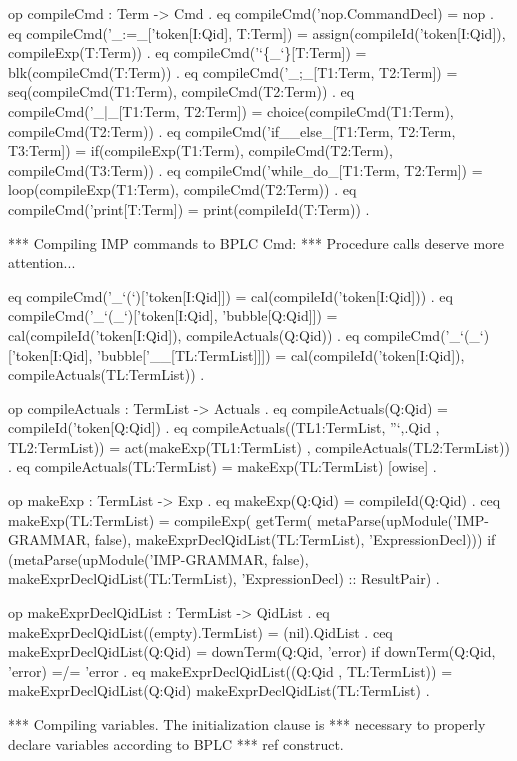 \documentclass[a4paper,openany]{book}
\begin{document}
\nwenddocs{}\endmoddef\nwstartdeflinemarkup\nwenddeflinemarkup
 op compileCmd : Term -> Cmd .
 eq compileCmd('nop.CommandDecl) = nop .
 eq compileCmd('_:=_['token[I:Qid], T:Term]) =
    assign(compileId('token[I:Qid]), compileExp(T:Term)) .
 eq compileCmd('`\{_`\}[T:Term]) = blk(compileCmd(T:Term)) .
 eq compileCmd('_;_[T1:Term, T2:Term]) =
    seq(compileCmd(T1:Term), compileCmd(T2:Term)) .
 eq compileCmd('_|_[T1:Term, T2:Term]) =
    choice(compileCmd(T1:Term), compileCmd(T2:Term)) .
 eq compileCmd('if__else_[T1:Term, T2:Term, T3:Term]) =
    if(compileExp(T1:Term), compileCmd(T2:Term), 
       compileCmd(T3:Term)) .
 eq compileCmd('while_do_[T1:Term, T2:Term]) =
    loop(compileExp(T1:Term), compileCmd(T2:Term)) .
 eq compileCmd('print[T:Term]) = print(compileId(T:Term)) .

 *** Compiling IMP commands to BPLC Cmd:
 *** Procedure calls deserve more attention...

 eq compileCmd('_`(`)['token[I:Qid]]) =
    cal(compileId('token[I:Qid])) .
 eq compileCmd('_`(_`)['token[I:Qid], 'bubble[Q:Qid]]) =
    cal(compileId('token[I:Qid]), compileActuals(Q:Qid)) .
 eq compileCmd('_`(_`)['token[I:Qid], 
               'bubble['__[TL:TermList]]]) =
    cal(compileId('token[I:Qid]), compileActuals(TL:TermList)) .

 op compileActuals : TermList -> Actuals .
 eq compileActuals(Q:Qid) = compileId('token[Q:Qid]) .
 eq compileActuals((TL1:TermList, ''`,.Qid , TL2:TermList)) =
    act(makeExp(TL1:TermList) , compileActuals(TL2:TermList)) .
 eq compileActuals(TL:TermList) = makeExp(TL:TermList) [owise] .
 
 op makeExp : TermList -> Exp .
 eq makeExp(Q:Qid) = compileId(Q:Qid) .
 ceq makeExp(TL:TermList) =
     compileExp(
      getTerm(
       metaParse(upModule('IMP-GRAMMAR, false),
        makeExprDeclQidList(TL:TermList), 'ExpressionDecl)))
  if (metaParse(upModule('IMP-GRAMMAR, false),
             makeExprDeclQidList(TL:TermList), 'ExpressionDecl) ::
            ResultPair) .

 op makeExprDeclQidList : TermList -> QidList .
 eq makeExprDeclQidList((empty).TermList) = (nil).QidList .
 ceq makeExprDeclQidList(Q:Qid) = downTerm(Q:Qid, 'error)
  if downTerm(Q:Qid, 'error) =/= 'error .
 eq makeExprDeclQidList((Q:Qid , TL:TermList)) =
    makeExprDeclQidList(Q:Qid) makeExprDeclQidList(TL:TermList) .
\nwendcode{}\nwdocspar

\nwenddocs{}\endmoddef\nwstartdeflinemarkup\nwenddeflinemarkup
 *** Compiling variables. The initialization clause is 
 *** necessary to properly declare variables according to BPLC 
 *** ref construct.
\end{document}
